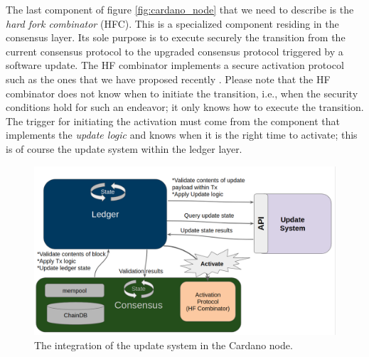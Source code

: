 The last component of figure \ref{fig:cardano_node} that we need to describe is 
the \emph{hard fork combinator} (HFC). This is a specialized 
component residing in the consensus layer. Its sole purpose is to execute 
securely the transition from the current consensus protocol to the upgraded 
consensus protocol triggered by a software update. The HF combinator implements 
a secure activation protocol such as the ones that we have proposed recently 
\cite{secure_activation}. Please note that the HF combinator does not know when 
to initiate the transition, i.e., when the security conditions hold for such an 
endeavor; it only knows how to execute the transition. The trigger for 
initiating the activation must come from the component that implements the 
\emph{update logic} and knows when it is the right time to activate; this is of 
course the update system within the ledger layer.

\begin{figure}[h!] %
	\centering
	\includegraphics[width=0.8\columnwidth,
	keepaspectratio]{figures/cardano_node_integration.png}
	\caption{The integration of the update system in the Cardano node.}
	\label{fig:cardano_node_integation}
\end{figure}

